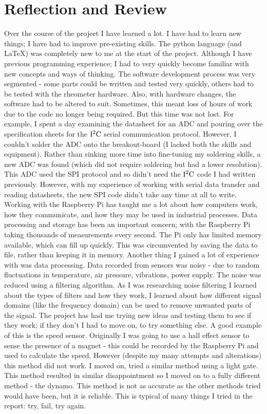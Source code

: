 \documentclass[twoside,a4]{report}
\def\shorttitle{Development of a Rheometer Controller}
\def\br{\newline \newline \noindent}
\def\achapter{\shorttitle}  %
\def\nc#1{
	\addtocounter{chapter}{1} 
	\def\achapter{\arabic{chapter} #1}
	\chapter*{\arabic{chapter} #1} 
	\addcontentsline{toc}{chapter}{\achapter} 
}
\begin{document}
	
	\nc{Reflection and Review}
	Over the course of the project I have learned a lot. I have had to learn new things; I have had to improve pre-existing skills. The python language (and \LaTeX) was completely new to me at the start of the project. Although I have previous programming experience; I had to very quickly become familiar with new concepts and ways of thinking. The software development process was very segmented - some parts could be written and tested very quickly, others had to be tested with the rheometer hardware. Also, with hardware changes, the software had to be altered to suit. Sometimes, this meant loss of hours of work due to the code no longer being required. But this time was not lost. For example, I spent a day examining the datasheet for an ADC and pouring over the specification sheets for the $\rm I^2C$ serial communication protocol. However, I couldn't solder the ADC onto the breakout-board (I lacked both the skills and equipment). Rather than sinking more time into fine-tuning my soldering skills, a new ADC was found (which did not require soldering but had a lower resolution). This ADC used the SPI protocol and so didn't need the $\rm I^2C$ code I had written previously. However, with my experience of working with serial data transfer and reading datasheets, the new SPI code didn't take any time at all to write.
	\br
	Working with the Raspberry Pi has taught me a lot about how computers work, how they communicate, and how they may be used in industrial processes. Data processing and storage has been an important concern; with the Raspberry Pi taking thousands of measurements every second. The Pi only has limited memory available, which can fill up quickly. This was circumvented by saving the data to file, rather than keeping it in memory. 
	\br
	Another thing I gained a lot of experience with was data processing. Data recorded from sensors was noisy - due to random fluctuations in temperature, air pressure, vibrations, power supply. The noise was reduced using a filtering algorithm. As I was researching noise filtering I learned about the types of filters and how they work, I learned about how different signal domains (like the frequency domain) can be used to remove unwanted parts of the signal.
	\br
	The project has had me trying new ideas and testing them to see if they work; if they don't I had to move on, to try something else. A good example of this is the speed sensor. Originally I was going to use a hall effect sensor to sense the presence of a magnet - this could be recorded by the Raspberry Pi and used to calculate the speed. However (despite my many attempts and alterations) this method did not work. I moved on, tried a similar method using a light gate. This method resulted in similar disappointment so I moved on to a fully different method - the dynamo. This method is not as accurate as the other methods tried would have been, but it is reliable. This is typical of many things I tried in the report: try, fail, try again. 
	
\end{document}
